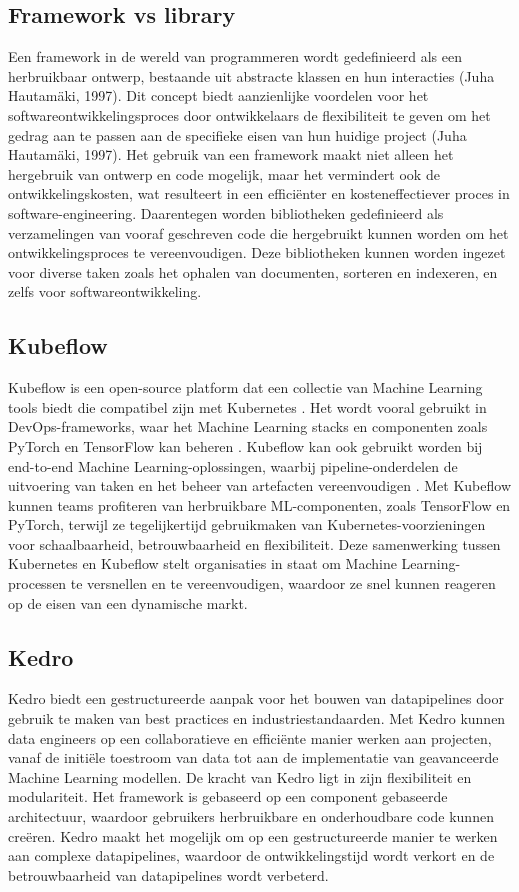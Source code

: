 \subsection{Framework vs library }
Een framework in de wereld van programmeren wordt gedefinieerd als een herbruikbaar ontwerp, bestaande uit abstracte klassen en hun interacties (Juha Hautamäki, 1997). Dit concept biedt aanzienlijke voordelen voor het softwareontwikkelingsproces door ontwikkelaars de flexibiliteit te geven om het gedrag aan te passen aan de specifieke eisen van hun huidige project (Juha Hautamäki, 1997). Het gebruik van een framework maakt niet alleen het hergebruik van ontwerp en code mogelijk, maar het vermindert ook de ontwikkelingskosten, wat resulteert in een efficiënter en kosteneffectiever proces in software-engineering. Daarentegen worden bibliotheken gedefinieerd als verzamelingen van vooraf geschreven code die hergebruikt kunnen worden om het ontwikkelingsproces te vereenvoudigen. Deze bibliotheken kunnen worden ingezet voor diverse taken zoals het ophalen van documenten, sorteren en indexeren, en zelfs voor softwareontwikkeling.
\subsection{Kubeflow}
Kubeflow is een open-source platform dat een collectie van Machine Learning tools biedt die compatibel zijn met Kubernetes \autocite{Stein2020}. Het wordt vooral gebruikt in DevOps-frameworks, waar het Machine Learning stacks en componenten zoals PyTorch en TensorFlow kan beheren \autocite{NGC2021}.
Kubeflow kan ook gebruikt worden bij end-to-end Machine Learning-oplossingen, waarbij pipeline-onderdelen de uitvoering van taken en het beheer van artefacten vereenvoudigen \autocite{Bisong2019}.
Met Kubeflow kunnen teams profiteren van herbruikbare ML-componenten, zoals TensorFlow en PyTorch, terwijl ze tegelijkertijd gebruikmaken van Kubernetes-voorzieningen voor schaalbaarheid, betrouwbaarheid en flexibiliteit. Deze samenwerking tussen Kubernetes en Kubeflow stelt organisaties in staat om Machine Learning-processen te versnellen en te vereenvoudigen, waardoor ze snel kunnen reageren op de eisen van een dynamische markt.
\subsection{Kedro}
Kedro biedt een gestructureerde aanpak voor het bouwen van datapipelines door gebruik te maken van best practices en industriestandaarden. Met Kedro kunnen data engineers op een collaboratieve en efficiënte manier werken aan projecten, vanaf de initiële toestroom van data tot aan de implementatie van geavanceerde Machine Learning modellen.
De kracht van Kedro ligt in zijn flexibiliteit en modulariteit. Het framework is gebaseerd op een component gebaseerde architectuur, waardoor gebruikers herbruikbare en onderhoudbare code kunnen creëren. Kedro maakt het mogelijk om op een gestructureerde manier te werken aan complexe datapipelines, waardoor de ontwikkelingstijd wordt verkort en de betrouwbaarheid van datapipelines wordt verbeterd.
